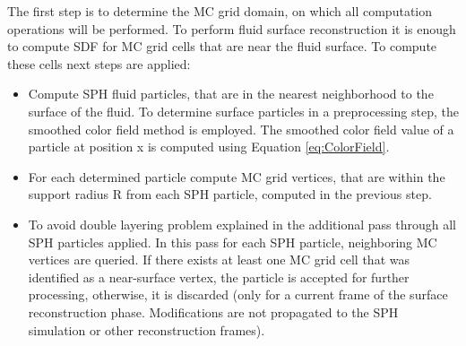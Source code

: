 The first step is to determine the MC grid domain, on which all computation operations will be performed. To perform fluid surface reconstruction it is enough to compute SDF for MC grid cells that are near the fluid surface. To compute these cells next steps are applied:
\begin{itemize}
		\item Compute SPH fluid particles, that are in the nearest neighborhood to the surface of the fluid. To determine surface particles in a preprocessing step, the smoothed color field method \cite{ColorField} is employed.  The smoothed color field value of a particle at position x is computed using Equation \ref{eq:ColorField}.
		\item For each determined particle compute MC grid vertices, that are within the support radius R from each SPH particle, computed in the previous step.
		\item To avoid double layering problem explained in the \cite{Akinchi} additional pass through all SPH particles applied. In this pass for each SPH particle, neighboring MC vertices are queried. If there exists at least one MC grid cell that was identified as a near-surface vertex, the particle is accepted for further processing, otherwise, it is discarded (only for a current frame of the surface reconstruction phase. Modifications are not propagated to the SPH simulation or other reconstruction frames).
\end{itemize}

